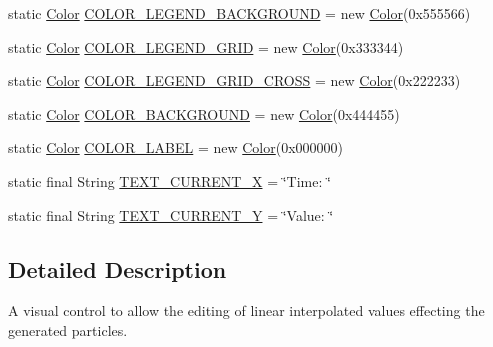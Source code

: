\begin{DoxyCompactItemize}
static \mbox{\hyperlink{classorg_1_1newdawn_1_1slick_1_1_color}{Color}} \mbox{\hyperlink{classorg_1_1newdawn_1_1slick_1_1tools_1_1peditor_1_1_graph_editor_window_a45f38bc4bf717da5d4da64efabed3682}{C\+O\+L\+O\+R\+\_\+\+L\+E\+G\+E\+N\+D\+\_\+\+B\+A\+C\+K\+G\+R\+O\+U\+ND}} = new \mbox{\hyperlink{classorg_1_1newdawn_1_1slick_1_1_color}{Color}}(0x555566)
\item 
static \mbox{\hyperlink{classorg_1_1newdawn_1_1slick_1_1_color}{Color}} \mbox{\hyperlink{classorg_1_1newdawn_1_1slick_1_1tools_1_1peditor_1_1_graph_editor_window_af7cc1af4d00a2e8a29a10e2f4750335c}{C\+O\+L\+O\+R\+\_\+\+L\+E\+G\+E\+N\+D\+\_\+\+G\+R\+ID}} = new \mbox{\hyperlink{classorg_1_1newdawn_1_1slick_1_1_color}{Color}}(0x333344)
\item 
static \mbox{\hyperlink{classorg_1_1newdawn_1_1slick_1_1_color}{Color}} \mbox{\hyperlink{classorg_1_1newdawn_1_1slick_1_1tools_1_1peditor_1_1_graph_editor_window_a86ff68ed3914f9c2a3c989c7d3be4fea}{C\+O\+L\+O\+R\+\_\+\+L\+E\+G\+E\+N\+D\+\_\+\+G\+R\+I\+D\+\_\+\+C\+R\+O\+SS}} = new \mbox{\hyperlink{classorg_1_1newdawn_1_1slick_1_1_color}{Color}}(0x222233)
\item 
static \mbox{\hyperlink{classorg_1_1newdawn_1_1slick_1_1_color}{Color}} \mbox{\hyperlink{classorg_1_1newdawn_1_1slick_1_1tools_1_1peditor_1_1_graph_editor_window_a1100870952be1cf64f2b4b6818c0422d}{C\+O\+L\+O\+R\+\_\+\+B\+A\+C\+K\+G\+R\+O\+U\+ND}} = new \mbox{\hyperlink{classorg_1_1newdawn_1_1slick_1_1_color}{Color}}(0x444455)
\item 
static \mbox{\hyperlink{classorg_1_1newdawn_1_1slick_1_1_color}{Color}} \mbox{\hyperlink{classorg_1_1newdawn_1_1slick_1_1tools_1_1peditor_1_1_graph_editor_window_aeb47ec67946b83a82c58ac591af30ce6}{C\+O\+L\+O\+R\+\_\+\+L\+A\+B\+EL}} = new \mbox{\hyperlink{classorg_1_1newdawn_1_1slick_1_1_color}{Color}}(0x000000)
\item 
static final String \mbox{\hyperlink{classorg_1_1newdawn_1_1slick_1_1tools_1_1peditor_1_1_graph_editor_window_aee9565b4a7a4256b262ea82309a010f8}{T\+E\+X\+T\+\_\+\+C\+U\+R\+R\+E\+N\+T\+\_\+X}} = \char`\"{}Time\+: \char`\"{}
\item 
static final String \mbox{\hyperlink{classorg_1_1newdawn_1_1slick_1_1tools_1_1peditor_1_1_graph_editor_window_ab3ed6cf89b62d2cf4c1047ff6d5ef6b5}{T\+E\+X\+T\+\_\+\+C\+U\+R\+R\+E\+N\+T\+\_\+Y}} = \char`\"{}Value\+: \char`\"{}
\end{DoxyCompactItemize}


\subsection{Detailed Description}
A visual control to allow the editing of linear interpolated values effecting the generated particles.

